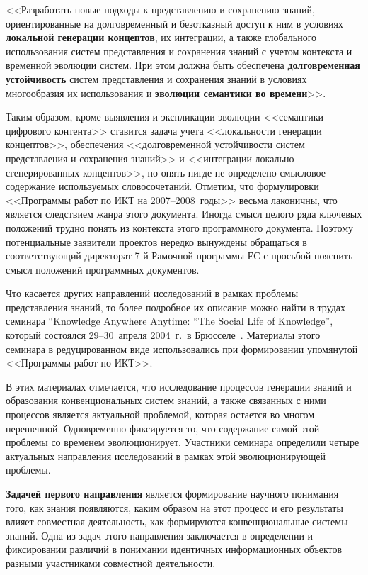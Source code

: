 \begin{multicols}{2}
   <<Разработать новые подходы к представлению и сохранению знаний, ориентированные
на долговременный и безотказный доступ к ним в условиях \textbf{локальной генерации
концептов}, их интеграции, а также глобального использования сис\-тем пред\-став\-ле\-ния и
сохранения знаний с учетом контекста и временной эволюции систем. При этом должна быть
обеспечена \textbf{долговременная устойчивость} сис\-тем представления и сохранения
знаний в условиях многообразия их использования и \textbf{эволюции семантики во
времени}>>.

   Таким образом, кроме выявления и экспликации эволюции <<семантики цифрового
контента>> ставится задача учета <<локальности генерации концептов>>, обеспечения
<<долговременной устой\-чи\-вости систем представления и сохранения знаний>> и
<<интеграции локально сгенерированных концептов>>, но опять нигде не определено
смысловое содержание используемых словосочетаний. Отметим, что формулировки
<<Программы работ по ИКТ на 2007--2008~годы>> весьма лаконичны, что является
следствием жанра этого документа. Иногда смысл целого ряда ключевых положений трудно
понять из контекста этого программного документа. Поэтому потенциальные заявители
проектов нередко вы\-нуж\-де\-ны обращаться в соответствующий директорат 7-й Рамочной
программы ЕС с просьбой пояснить смысл положений программных документов.

   Что касается других направлений исследований в рамках проблемы представления
знаний, то более подробное их описание можно найти в трудах семинара ``Knowledge
Anywhere Anytime: ``The Social Life of Knowledge'', который состоялся 29--30~апреля
2004~г.\ в Брюсселе~\cite{17za}. Материалы этого семинара в редуцированном виде
использовались при формировании упомянутой <<Программы работ по ИКТ>>.

   В этих материалах  отмечается, что исследование процессов генерации знаний и
образования конвенциональных систем знаний, а также связанных с ними процессов
является актуальной проблемой, которая остается во многом нерешенной. Одновременно
фиксируется то, что содержание самой этой проблемы со временем эволюционирует.
Участники семинара определили четыре актуальных на\-прав\-ле\-ния исследований в рамках
этой эволюционирующей проблемы.

   \textbf{Задачей первого направления} является формирование научного понимания
того, как знания появляются, каким образом на этот процесс и его резуль\-та\-ты влияет
совместная деятельность, как %
формируются конвенциональные системы знаний. Одна из
задач этого направления заключается в определении и фиксировании различий в понимании
идентичных информационных объектов разными участниками совместной деятельности.


\end{multicols}
